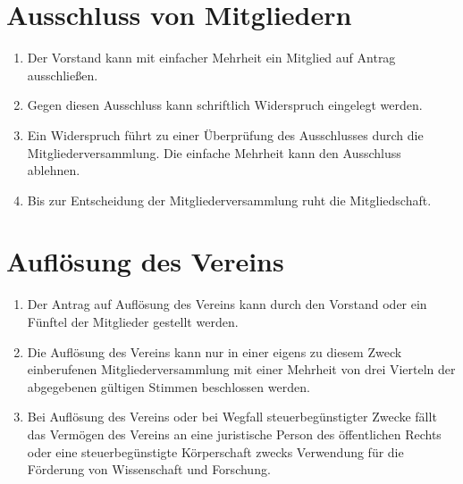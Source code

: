 \documentclass[a4paper, 12pt]{scrartcl}
\begin{document}
\section{Ausschluss von Mitgliedern}
\begin{enumerate}
	\item Der Vorstand kann mit einfacher Mehrheit ein Mitglied auf Antrag ausschließen.
	\item Gegen diesen Ausschluss kann schriftlich Widerspruch eingelegt werden.
	\item Ein Widerspruch führt zu einer Überprüfung des Ausschlusses durch die Mitgliederversammlung. Die einfache Mehrheit kann den Ausschluss ablehnen.
	\item Bis zur Entscheidung der Mitgliederversammlung ruht die Mitgliedschaft.
\end{enumerate}

\section{Auflösung des Vereins}
\label{aufloesung-des-vereins}
\begin{enumerate}
	\item Der Antrag auf Auflösung des Vereins kann durch den Vorstand oder ein Fünftel der Mitglieder gestellt werden.
	\item Die Auflösung des Vereins kann nur in einer eigens zu diesem Zweck einberufenen Mitgliederversammlung mit einer Mehrheit von drei Vierteln der abgegebenen gültigen Stimmen beschlossen werden.
	\item \label{aufloesung-des-vereins-3} Bei Auflösung des Vereins oder bei Wegfall steuerbegünstigter Zwecke fällt das Vermögen des Vereins an eine juristische Person des öffentlichen Rechts oder eine steuerbegünstigte Körperschaft zwecks Verwendung für die Förderung von Wissenschaft und Forschung.
\end{enumerate}

\vspace{2.5cm}
\end{document}
